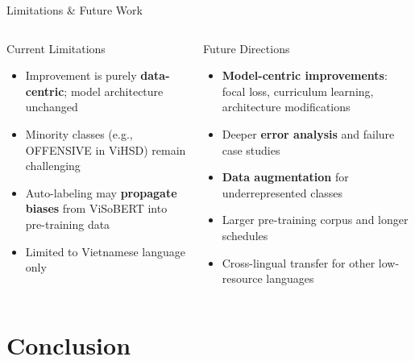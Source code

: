 \documentclass[10pt, aspectratio=169]{beamer}
\begin{document}
\begin{frame}[shrink=5]{Limitations \& Future Work}
  \begin{columns}[T]
    \begin{alertblock}{Current Limitations}
      \begin{itemize}
        \item Improvement is purely \textbf{data-centric}; model architecture unchanged
        \item Minority classes (e.g., OFFENSIVE in ViHSD) remain challenging
        \item Auto-labeling may \textbf{propagate biases} from ViSoBERT into pre-training data
        \item Limited to Vietnamese language only
      \end{itemize}
    \end{alertblock}

    \begin{exampleblock}{Future Directions}
      \begin{itemize}
        \item \textbf{Model-centric improvements}: focal loss, curriculum learning, architecture modifications
        \item Deeper \textbf{error analysis} and failure case studies
        \item \textbf{Data augmentation} for underrepresented classes
        \item Larger pre-training corpus and longer schedules
        \item Cross-lingual transfer for other low-resource languages
      \end{itemize}
    \end{exampleblock}
  \end{columns}
\end{frame}

\section{Conclusion}
\end{document}
